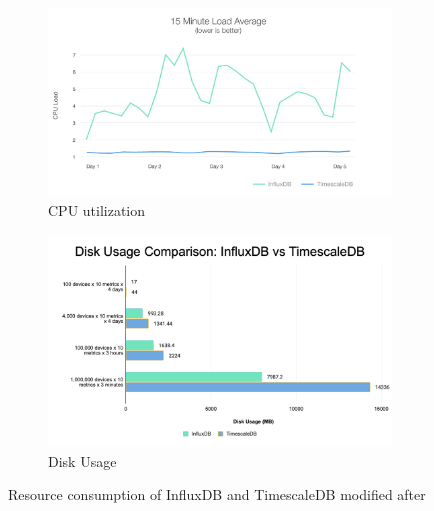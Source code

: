         \begin{figure}
            \centering
            \begin{subfigure}[b]{0.49\textwidth}
                \includegraphics[width=\textwidth]{latex/figures/cpu_load_influx_ts.png}
                \caption[CPU utilization]{CPU utilization}
                \label{fig:cpu_db}
            \end{subfigure}
            \begin{subfigure}[b]{0.49\textwidth}
                \includegraphics[width=\textwidth]{latex/figures/diskusage_influx_ts.png}
                \caption[Disk Usage]{Disk Usage}
                \label{fig:disk_db}
            \end{subfigure}
            \caption[Resource consumption of InfluxDB and TimescaleDB]{Resource consumption of InfluxDB and TimescaleDB modified after \cite{freedman_timescaledb_2020}}
        \end{figure}
        

